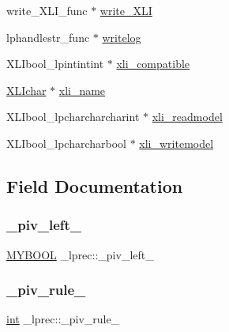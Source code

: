\begin{DoxyCompactItemize}
\item 
write\+\_\+\+X\+L\+I\+\_\+func $\ast$ \hyperlink{struct__lprec_a180f420d65f3ec526b30d4f412f9b245}{write\+\_\+\+X\+LI}
\item 
lphandlestr\+\_\+func $\ast$ \hyperlink{struct__lprec_abebe2890106b0cfbcb0889016cc950a7}{writelog}
\item 
X\+L\+Ibool\+\_\+lpintintint $\ast$ \hyperlink{struct__lprec_a50c1a0c47e2474be16851dd0c8b26258}{xli\+\_\+compatible}
\item 
\hyperlink{lp__lib_8h_a44d441822dca4210a8458ba33a1ef89b}{X\+L\+Ichar} $\ast$ \hyperlink{struct__lprec_a9170c25246d72dd3fd3f78f52cd5b1cf}{xli\+\_\+name}
\item 
X\+L\+Ibool\+\_\+lpcharcharcharint $\ast$ \hyperlink{struct__lprec_a87003286e722237e20ef74188878ebf3}{xli\+\_\+readmodel}
\item 
X\+L\+Ibool\+\_\+lpcharcharbool $\ast$ \hyperlink{struct__lprec_ace0253ef27dfeb63e80be0caccca1683}{xli\+\_\+writemodel}
\end{DoxyCompactItemize}


\subsection{Field Documentation}
\mbox{\label{struct__lprec_adb309f1d47a67306a8692d8814d7f8a7}} 
\subsubsection{\texorpdfstring{\+\_\+piv\+\_\+left\+\_\+}{\_piv\_left\_}}
{\footnotesize\ttfamily \hyperlink{lp__lib_8h_aad848328fb3018217ac9f01d97b6bd88}{M\+Y\+B\+O\+OL} \+\_\+lprec\+::\+\_\+piv\+\_\+left\+\_\+}

\mbox{\label{struct__lprec_ad8ad8e5228b248c61b268705f09d9d2e}} 
\subsubsection{\texorpdfstring{\+\_\+piv\+\_\+rule\+\_\+}{\_piv\_rule\_}}
{\footnotesize\ttfamily \hyperlink{lp__lib_8h_adeb9ec6400320e4923ac9d836d509ddb}{int} \+\_\+lprec\+::\+\_\+piv\+\_\+rule\+\_\+}

